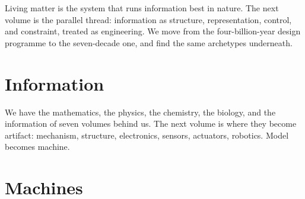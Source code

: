 \documentclass[11pt,a4paper,openright,twoside]{memoir}
\begin{document}
\begin{interlude}
Living matter is the system that runs information best in nature.
The next volume is the parallel thread: information as structure, representation, control, and constraint, treated as engineering.
We move from the four-billion-year design programme to the seven-decade one, and find the same archetypes underneath.
\end{interlude}

\part{Information}
\label{vol07}























\begin{interlude}
We have the mathematics, the physics, the chemistry, the biology, and the information of seven volumes behind us.
The next volume is where they become artifact: mechanism, structure, electronics, sensors, actuators, robotics.
Model becomes machine.
\end{interlude}

\part{Machines}
\label{vol08}
\end{document}
